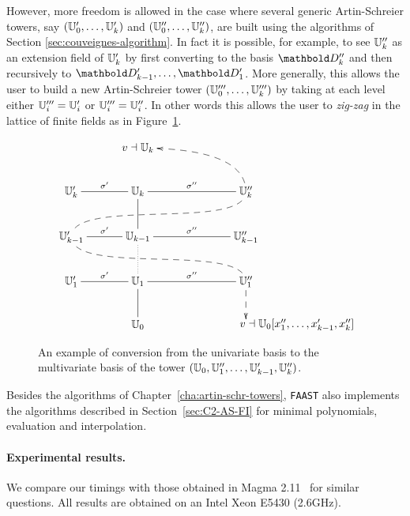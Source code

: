   However, more freedom is allowed in the case where
several generic Artin-Schreier towers, say $(\mathbb{U}_0',\ldots,\mathbb{U}_k')$ and
$(\mathbb{U}_0'',\ldots,\mathbb{U}_k'')$, are built using the algorithms of Section
\ref{sec:couveignes-algorithm}. In fact it is possible, for example,
to see $\mathbb{U}_k''$ as an extension field of $\mathbb{U}'_k$ by first converting
to the basis $\basis{D}''_k$ and then recursively to
$\basis{D}'_{k-1},\ldots,\basis{D}'_1$. More generally, this allows
the user to build a new Artin-Schreier tower
$(\mathbb{U}_0''',\ldots,\mathbb{U}_k''')$ by taking at each level either
$\mathbb{U}_i'''=\mathbb{U}_i'$ or $\mathbb{U}_i'''=\mathbb{U}_i''$.  In other words this allows the
user to \emph{zig-zag} in the lattice of finite fields as in
Figure~\ref{fig:lattice}.

\begin{figure}
  \centering
  \begin{equation*}
    \xymatrix@C=1cm{
      & v\wrt\U_k \ar@{<--}@(r,u)[dr] \\
      \U_k'\ar@{-}[r]^{\sigma'} & \U_k\ar@{-}[d] & \U_k''\ar@{-}[l]_{\sigma''} \ar@{--}@(d,u)[dll]\\
      \U_{k-1}'\ar@{-}[r]^{\sigma'} \ar@{--}@(d,u)[drr] & \U_{k-1}\ar@{.}[d] & \U_{k-1}''\ar@{-}[l]_{\sigma''}\\
      \U_1'\ar@{-}[r]^{\sigma'} & \U_1\ar@{-}[d] & \U_1''\ar@{-}[l]_{\sigma''}\ar@{-->}[d]\\
      & \U_0 & *[r]{v\wrt\U_0[x_1'',\ldots,x_{k-1}',x_k'']}
    }
  \end{equation*}
  \caption{An example of conversion from the univariate basis to the
    multivariate basis of the tower $(\mathbb{U}_0,\mathbb{U}_1'',\ldots,\mathbb{U}_{k-1}',\mathbb{U}_k'')$.}
  \label{fig:lattice}
\end{figure}

Besides the algorithms of Chapter~\ref{cha:artin-schr-towers},
\texttt{FAAST} also implements the algorithms described in
Section~\ref{sec:C2-AS-FI} for minimal polynomials, evaluation and
interpolation.

\paragraph{Experimental results.} We compare our timings with those
obtained in Mag\-ma 2.11~\cite{MAGMA} for similar questions.  All
results are obtained on an Intel Xeon E5430 (2.6GHz).


